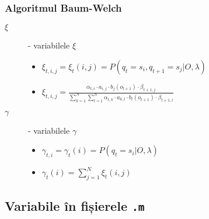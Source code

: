 \documentclass[12pt]{article}
\begin{document}
\subsubsection{Algoritmul Baum-Welch}
\label{sec:baum-welch-not}

\begin{description}
\item[$\xi$] - variabilele $\xi$
  \begin{itemize}
  \item $\xi_{t,i,j} = \xi_t(i,j) = P(q_t=s_i,q_{t+1}=s_j \vert O,
    \lambda)$
  \item $\xi_{t,i,j} = \frac{\alpha_{t,i}\cdot a_{i,j} \cdot b_j(o_{t+1}) \cdot
		        \beta_{t+1,j}}{
		        \displaystyle\sum_{k=1}^{N}\displaystyle\sum_{l=1}^{N}
		        \alpha_{t,k}\cdot a_{k,l} \cdot b_l(o_{t+1}) \cdot
		        \beta_{t+1,l}}$
  \end{itemize}
\item[$\gamma$] - variabilele $\gamma$
  \begin{itemize}
  \item $\gamma_{t,i} = \gamma_t(i) = P(q_t = s_i \vert O, \lambda)$
  \item $\gamma_t(i) = \displaystyle\sum_{j=1}^{N}\xi_t(i,j)$
  \end{itemize}
\end{description}

\subsection{Variabile în fișierele \texttt{.m}}
\label{sec:m-variables}
\end{document}
